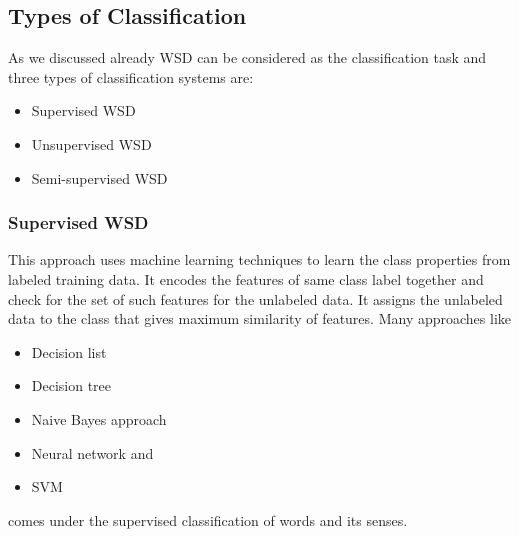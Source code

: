 \documentclass{bmcart}
\begin{document}
\subsection{Types of Classification}
\label{ssec:classificationTypes}

As we discussed already WSD can be considered as the classification task and three types of classification systems are:
\begin{itemize}
\item Supervised WSD
\item Unsupervised WSD
\item Semi-supervised WSD
\end{itemize}

\subsubsection{Supervised WSD}
\label{sssec:supervisedWSD}
This approach uses machine learning techniques to learn the class properties from labeled training data. It encodes the features of same class label together and check for the set of such features for the unlabeled data. It assigns the unlabeled data to the class that gives maximum similarity of features. Many approaches like 
\begin{itemize}
\item Decision list 
\item Decision tree
\item Naive Bayes approach
\item Neural network and
\item SVM 
\end{itemize} 
comes under the supervised classification of words and its senses. 
\end{document}
